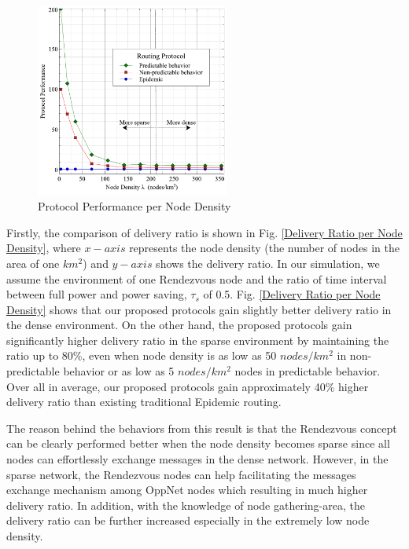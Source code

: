 \documentclass[conference]{IEEEtran}
\begin{document}
\begin{figure}[!t]
\centering
\includegraphics[width=2.5in]{Graphs/ProtocolPerformance.pdf}
\caption{Protocol Performance per Node Density}
\label{Protocol Performance per Node Density}
\end{figure}

Firstly, the comparison of delivery ratio is shown in Fig. \ref{Delivery Ratio per Node Density}, where $x-axis$ represents the node density (the number of nodes in the area of one $km^2$) and $y-axis$ shows the delivery ratio.
In our simulation, we assume the environment of one Rendezvous node and the ratio of time interval between full power and power saving, $\tau_s$ of 0.5.
%
Fig. \ref{Delivery Ratio per Node Density} shows that our proposed protocols gain slightly better delivery ratio in the dense environment.
On the other hand, the proposed protocols gain significantly higher delivery ratio in the sparse environment by maintaining the ratio up to 80\%, even when node density is as low as 50 $nodes/km^2$ in non-predictable behavior or as low as 5 $nodes/km^2$ nodes in predictable behavior.
Over all in average, our proposed protocols gain approximately 40\% higher delivery ratio than existing traditional Epidemic routing.

The reason behind the behaviors from this result is that the Rendezvous concept can be clearly performed better when the node density becomes sparse since all nodes can effortlessly exchange messages in the dense network.
However, in the sparse network, the Rendezvous nodes can help facilitating the messages exchange mechanism among OppNet nodes which resulting in much higher delivery ratio.
In addition, with the knowledge of node gathering-area, the delivery ratio can be further increased especially in the extremely low node density.
\end{document}
